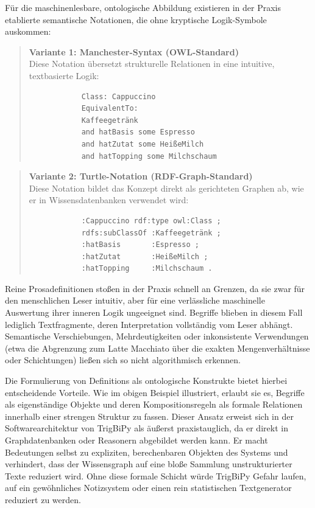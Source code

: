 \documentclass[11pt, a4paper]{article}
\begin{document}
	Für die maschinenlesbare, ontologische Abbildung existieren in der Praxis etablierte semantische Notationen, die ohne kryptische Logik-Symbole auskommen:
	
	\begin{quote}
		\textbf{Variante 1: Manchester-Syntax (OWL-Standard)} \\
		Diese Notation übersetzt strukturelle Relationen in eine intuitive, textbasierte Logik:
		\begin{verbatim}
			Class: Cappuccino
			EquivalentTo: 
			Kaffeegetränk 
			and hatBasis some Espresso 
			and hatZutat some HeißeMilch 
			and hatTopping some Milchschaum
		\end{verbatim}
	\end{quote}
	
	\begin{quote}
		\textbf{Variante 2: Turtle-Notation (RDF-Graph-Standard)} \\
		Diese Notation bildet das Konzept direkt als gerichteten Graphen ab, wie er in Wissensdatenbanken verwendet wird:
		\begin{verbatim}
			:Cappuccino rdf:type owl:Class ;
			rdfs:subClassOf :Kaffeegetränk ;
			:hatBasis       :Espresso ;
			:hatZutat       :HeißeMilch ;
			:hatTopping     :Milchschaum .
		\end{verbatim}
	\end{quote}
	
	Reine Prosadefinitionen stoßen in der Praxis schnell an Grenzen, da sie zwar für den menschlichen Leser intuitiv, aber für eine verlässliche maschinelle Auswertung ihrer inneren Logik ungeeignet sind. Begriffe blieben in diesem Fall lediglich Textfragmente, deren Interpretation vollständig vom Leser abhängt. Semantische Verschiebungen, Mehrdeutigkeiten oder inkonsistente Verwendungen (etwa die Abgrenzung zum Latte Macchiato über die exakten Mengenverhältnisse oder Schichtungen) ließen sich so nicht algorithmisch erkennen.
	
	Die Formulierung von Definitions als ontologische Konstrukte bietet hierbei entscheidende Vorteile. Wie im obigen Beispiel illustriert, erlaubt sie es, Begriffe als eigenständige Objekte und deren Kompositionsregeln als formale Relationen innerhalb einer strengen Struktur zu fassen. Dieser Ansatz erweist sich in der Softwarearchitektur von TrigBiPy als äußerst praxistauglich, da er direkt in Graphdatenbanken oder Reasonern abgebildet werden kann. Er macht Bedeutungen selbst zu expliziten, berechenbaren Objekten des Systems und verhindert, dass der Wissensgraph auf eine bloße Sammlung unstrukturierter Texte reduziert wird. Ohne diese formale Schicht würde TrigBiPy Gefahr laufen, auf ein gewöhnliches Notizsystem oder einen rein statistischen Textgenerator reduziert zu werden. 
	
\end{document}
